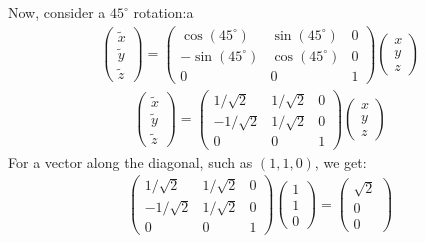 \documentclass[../template.tex]{subfiles}
\begin{document}
Now, consider a $45^\circ$ rotation:a
\begin{align*}
    \left(\begin{array}{c}
    \tilde{x} \\ 
    \tilde{y} \\ 
    \tilde{z}
    \end{array}\right) = \left(\begin{array}{ccc}
    \cos(45^\circ) & \sin(45^\circ) & 0 \\ 
    -\sin(45^\circ) & \cos(45^\circ) & 0 \\ 
    0 & 0 & 1
    \end{array}\right) \left(\begin{array}{c}
    x \\ 
    y \\ 
    z
    \end{array}\right)
\end{align*}
\begin{align*}
    \left(\begin{array}{c}
        \tilde{x} \\ 
        \tilde{y} \\ 
        \tilde{z}
        \end{array}\right) = \left(\begin{array}{ccc}
        1/\sqrt{2} & 1/\sqrt{2} & 0 \\ 
        -1/\sqrt{2} & 1/\sqrt{2} & 0 \\ 
        0 & 0 & 1
        \end{array}\right) \left(\begin{array}{c}
        x \\ 
        y \\ 
        z
        \end{array}\right)
\end{align*}
For a vector along the diagonal, such as $(1,1,0)$, we get:
\begin{align*}
    \left(\begin{array}{ccc}
        1/\sqrt{2} & 1/\sqrt{2} & 0 \\ 
        -1/\sqrt{2} & 1/\sqrt{2} & 0 \\ 
        0 & 0 & 1
        \end{array}\right) \left(\begin{array}{c}
        1 \\ 
        1 \\ 
        0
        \end{array}\right) = \left(\begin{array}{c}
        \sqrt{2} \\ 
        0 \\ 
        0
        \end{array}\right)
\end{align*}
\end{document}
